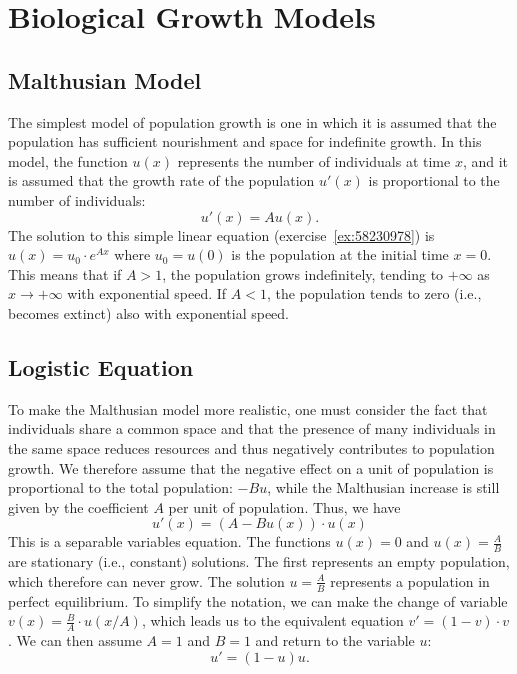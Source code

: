 \section{Biological Growth Models}
%

\subsection{Malthusian Model}
%
%
%

The simplest model of population growth is one in which it is assumed that the
population has sufficient nourishment and space for indefinite growth. In this
model, the function $u(x)$ represents the number of individuals at time $x$, and
it is assumed that the growth rate of the population $u'(x)$ is proportional to
the number of individuals:
\[
  u'(x) = A u(x).  
\]
The solution to this simple linear equation (exercise~\ref{ex:58230978}) is
$u(x) = u_0\cdot  e^{A x}$ where $u_0=u(0)$ is the population at the initial
time $x=0$. This means that if $A>1$, the population grows indefinitely, tending
to $+\infty$ as $x\to +\infty$ with exponential speed. If $A<1$, the population
tends to zero (i.e., becomes extinct) also with exponential speed.

\subsection{Logistic Equation}
%
%
%

To make the Malthusian model more realistic, one must consider the fact that
individuals share a common space and that the presence of many individuals in
the same space reduces resources and thus negatively contributes to population
growth. We therefore assume that the negative effect on a unit of population is
proportional to the total population: $-Bu$, while the Malthusian increase is
still given by the coefficient $A$ per unit of population. Thus, we have
\[
  u'(x)  = (A-Bu(x))\cdot u(x)
\]
This is a separable variables equation. The functions $u(x) = 0$ and $u(x) =
\frac{A}{B}$ are stationary (i.e., constant) solutions. The first represents an
empty population, which therefore can never grow. The solution $u=\frac{A}{B}$
represents a population in perfect equilibrium. To simplify the notation, we can
make the change of variable $v(x) = \frac{B}{A}\cdot u(x/A)$, which leads us to
the equivalent equation $v'=(1-v)\cdot v$. We can then assume $A=1$ and $B=1$
and return to the variable $u$:
\begin{equation}\label{eq:ode_logistica}
  u' = (1-u) u.  
\end{equation}

